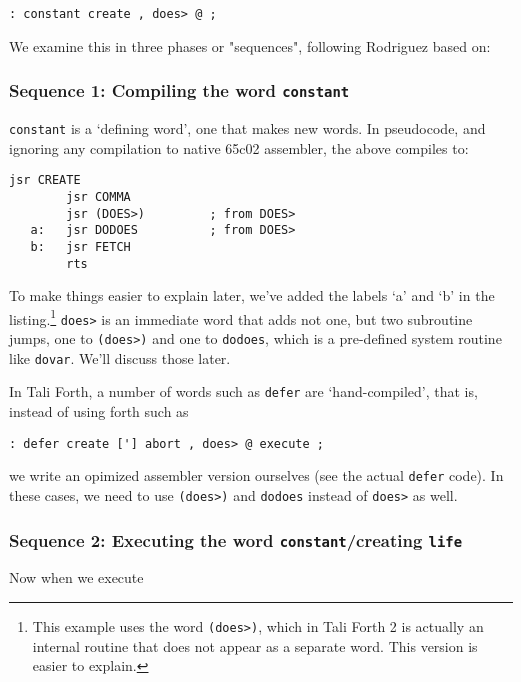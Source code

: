 \begin{lstlisting}[frame=lines]
        : constant create , does> @ ; 
\end{lstlisting}

\noindent We examine this in three phases or "sequences", following Rodriguez
based on\cite{derickbaker}:

\subsubsection{Sequence 1: Compiling the word \texttt{constant}}

\texttt{constant} is a `defining word', one that makes new words. In pseudocode, and
ignoring any compilation to native 65c02 assembler, the above compiles to: 
\begin{lstlisting}[frame=lines]
        jsr CREATE
        jsr COMMA
        jsr (DOES>)         ; from DOES>
   a:   jsr DODOES          ; from DOES>
   b:   jsr FETCH
        rts
\end{lstlisting}

\noindent To make things easier to explain later, we've added the labels `a' and
`b' in the listing.\footnote{This example uses the word \texttt{(does>)}, which
in Tali Forth 2 is actually an internal routine that does not appear as a
separate word. This version is easier to explain.} \texttt{does>} is an
immediate word that adds not one, but two subroutine jumps, one to
\texttt{(does>)} and one to \texttt{dodoes}, which is a pre-defined system
routine like \texttt{dovar}. We'll discuss those later.

In Tali Forth, a number of words such as \texttt{defer} are
`hand-compiled', that is, instead of using forth such as

\begin{lstlisting}[frame=lines]
        : defer create ['] abort , does> @ execute ; 
\end{lstlisting}

\noindent we write an opimized assembler version ourselves (see the actual \texttt{defer}
code). In these cases, we need to use \texttt{(does>)} and \texttt{dodoes}
instead of \texttt{does>} as well.


\subsubsection{Sequence 2: Executing the word \texttt{constant}/creating
\texttt{life}}

Now when we execute

